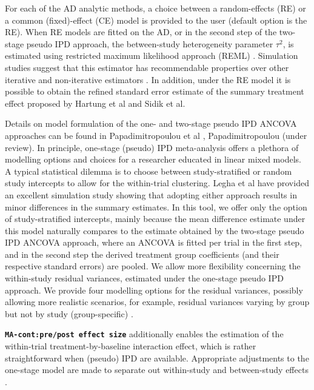 \documentclass[AMA,STIX1COL]{WileyNJD-v2}
\begin{document}
For each of the AD analytic methods, a choice between a random-effects (RE) or a common (fixed)-effect (CE) model \citep{hedges1985statistical, Borenstein2009} is provided to the user (default option is the RE). When RE models are fitted on the AD, or in the second step of the two-stage pseudo IPD approach, the between-study heterogeneity parameter $\tau^2$, is estimated using restricted maximum likelihood approach (REML) \citep{raudenbush2009analyzing}. Simulation studies suggest that this estimator has recommendable properties over other iterative and non-iterative estimators \citep{viechtbauer2005bias, veroniki2016methods}. In addition, under the RE model it is possible to obtain the refined standard error estimate of the summary treatment effect proposed by Hartung et al\cite{HartungJ.Knapp2001} and Sidik et al\cite{sidik2002simple}.

Details on model formulation of the one- and two-stage pseudo IPD ANCOVA approaches can be found in Papadimitropoulou et al \cite{papadimitropoulou2020meta}, Papadimitropoulou (under review). In principle, one-stage (pseudo) IPD meta-analysis offers a plethora of modelling options and choices for a researcher educated in linear mixed models. A typical statistical dilemma is to choose between study-stratified or random study intercepts to allow for the within-trial clustering. Legha et al\cite{legha2018individual} have provided an excellent simulation study showing that adopting either approach results in minor differences in the summary estimates. In this tool, we offer only the option of study-stratified intercepts, mainly because the mean difference estimate under this model naturally compares to the estimate obtained by the two-stage pseudo IPD ANCOVA approach, where an ANCOVA is fitted per trial in the first step, and in the second step the derived treatment group coefficients (and their respective standard errors) are pooled. We allow more flexibility concerning the within-study residual variances, estimated under the one-stage pseudo IPD approach. We provide four modelling options for the residual variances, possibly allowing more realistic scenarios, for example, residual variances varying by group but not by study (group-specific) \citep{papadimitropoulou2020meta, papadimitropoulou2019one,schmid2020handbook}.

\textbf{\texttt{MA-cont:pre/post effect size}} additionally enables the estimation of the within-trial treatment-by-baseline interaction effect, which is rather straightforward when (pseudo) IPD are available. Appropriate adjustments to the one-stage model are made to separate out within-study and between-study effects \citep{hua2017one, riley2020individual}.
\end{document}
